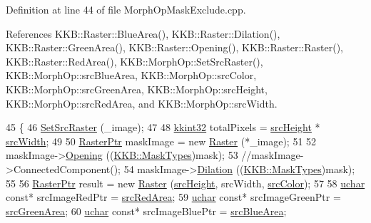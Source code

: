 Definition at line 44 of file Morph\+Op\+Mask\+Exclude.\+cpp.



References K\+K\+B\+::\+Raster\+::\+Blue\+Area(), K\+K\+B\+::\+Raster\+::\+Dilation(), K\+K\+B\+::\+Raster\+::\+Green\+Area(), K\+K\+B\+::\+Raster\+::\+Opening(), K\+K\+B\+::\+Raster\+::\+Raster(), K\+K\+B\+::\+Raster\+::\+Red\+Area(), K\+K\+B\+::\+Morph\+Op\+::\+Set\+Src\+Raster(), K\+K\+B\+::\+Morph\+Op\+::src\+Blue\+Area, K\+K\+B\+::\+Morph\+Op\+::src\+Color, K\+K\+B\+::\+Morph\+Op\+::src\+Green\+Area, K\+K\+B\+::\+Morph\+Op\+::src\+Height, K\+K\+B\+::\+Morph\+Op\+::src\+Red\+Area, and K\+K\+B\+::\+Morph\+Op\+::src\+Width.


\begin{DoxyCode}
45 \{
46   \hyperlink{class_k_k_b_1_1_morph_op_a07c75e151d9b95ca13da3bfc2e48dba4}{SetSrcRaster} (\_image);
47 
48   \hyperlink{namespace_k_k_b_a8fa4952cc84fda1de4bec1fbdd8d5b1b}{kkint32}  totalPixels = \hyperlink{class_k_k_b_1_1_morph_op_a54b2ce1b398a80803b4dbe8aef956b51}{srcHeight} * \hyperlink{class_k_k_b_1_1_morph_op_aec2cfb3015497e4077751fc5f19559ab}{srcWidth};
49 
50   \hyperlink{class_k_k_b_1_1_raster}{RasterPtr}  maskImage = \textcolor{keyword}{new} \hyperlink{class_k_k_b_1_1_raster}{Raster} (*\_image);
51 
52   maskImage->\hyperlink{class_k_k_b_1_1_raster_a97cd9df45456230dc14e5c448f8d379e}{Opening} ((\hyperlink{class_k_k_b_1_1_morph_op_a9eaa0383bf9e046da208af397e7e35eb}{KKB::MaskTypes})mask);
53   \textcolor{comment}{//maskImage->ConnectedComponent();}
54   maskImage->\hyperlink{class_k_k_b_1_1_raster_afb263b7cc4ab60bf6745c5166173bbb9}{Dilation} ((\hyperlink{class_k_k_b_1_1_morph_op_a9eaa0383bf9e046da208af397e7e35eb}{KKB::MaskTypes})mask);
55 
56   \hyperlink{class_k_k_b_1_1_raster}{RasterPtr}  result = \textcolor{keyword}{new} \hyperlink{class_k_k_b_1_1_raster}{Raster} (\hyperlink{class_k_k_b_1_1_morph_op_a54b2ce1b398a80803b4dbe8aef956b51}{srcHeight}, srcWidth, 
      \hyperlink{class_k_k_b_1_1_morph_op_a0cecdeb8369c7ab2689fbd9f997472b0}{srcColor});
57 
58   \hyperlink{namespace_k_k_b_ace9969169bf514f9ee6185186949cdf7}{uchar} \textcolor{keyword}{const}*  srcImageRedPtr   = \hyperlink{class_k_k_b_1_1_morph_op_acd1f255803231ecfabc0609685e56abe}{srcRedArea};
59   \hyperlink{namespace_k_k_b_ace9969169bf514f9ee6185186949cdf7}{uchar} \textcolor{keyword}{const}*  srcImageGreenPtr = \hyperlink{class_k_k_b_1_1_morph_op_a1a3372b8645c297f21c5805707aef8a0}{srcGreenArea};
60   \hyperlink{namespace_k_k_b_ace9969169bf514f9ee6185186949cdf7}{uchar} \textcolor{keyword}{const}*  srcImageBluePtr  = \hyperlink{class_k_k_b_1_1_morph_op_a52fcf660b2173a2b6e8988ed23cf638c}{srcBlueArea};

\end{DoxyCode}
